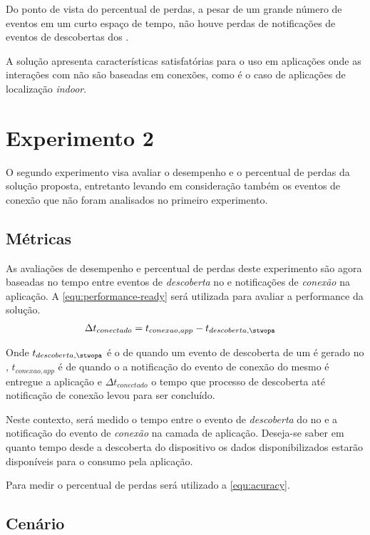 Do ponto de vista do percentual de perdas, a pesar de um grande número de eventos em um curto espaço de tempo, não houve perdas de notificações de eventos de descobertas dos \beacons.

A solução apresenta características satisfatórias para o uso em aplicações onde as interações com \smartobjs não são baseadas em conexões, como é o caso de aplicações de localização \textit{indoor}.

\section{Experimento 2}

O segundo experimento visa avaliar o desempenho e o percentual de perdas da solução proposta, entretanto levando em consideração também os eventos de conexão que não foram analisados no primeiro experimento.

\subsection{Métricas}

As avaliações de desempenho e percentual de perdas deste experimento são agora baseadas no tempo entre eventos de \emph{descoberta} no \stwopa e notificações de \emph{conexão} na aplicação.  
A \autoref{equ:performance-ready} será utilizada para avaliar a performance da solução.
\begin{align}
	\label{equ:performance-ready}
	\Delta t_{conectado} &= t_{conexao,app} - t_{descoberta,\stwopa}
\end{align}

Onde $t_{descoberta,\stwopa}$ é o \timestamp de quando um evento de descoberta de um \smartobj é gerado no \stwopa, $t_{conexao,app}$ é \timestamp de quando o a notificação do evento de conexão do mesmo \smartobj é entregue a aplicação e $\Delta t_{conectado}$ o tempo que processo de descoberta até notificação de conexão levou para ser concluído.

Neste contexto, será medido o tempo entre o evento de \emph{descoberta} do \smartobj no \stwopa e a notificação do evento de \emph{conexão} na camada de aplicação.
Deseja-se saber em quanto tempo desde a descoberta do dispositivo os dados disponibilizados estarão disponíveis para o consumo pela aplicação.

Para medir o percentual de perdas será utilizado a \autoref{equ:acuracy}.

\subsection{Cenário}

